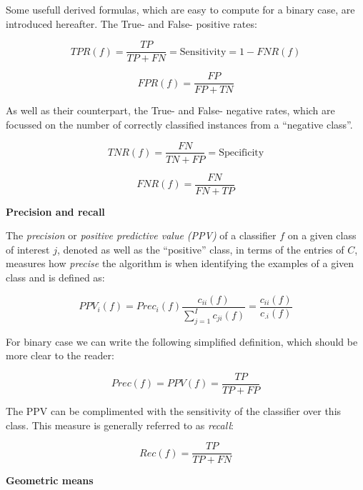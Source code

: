 \documentclass[12pt,]{article}
\begin{document}
Some usefull derived formulas, which are easy to compute for a binary
case, are introduced hereafter. The True- and False- positive rates:

\begin{equation}
TPR (f) = \frac{TP}{TP + FN} = \text{Sensitivity} = 1 - FNR (f)
\end{equation}

\begin{equation}
FPR (f) = \frac{FP}{FP + TN}
\end{equation}

As well as their counterpart, the True- and False- negative rates, which
are focussed on the number of correctly classified instances from a
``negative class''.

\begin{equation}
TNR (f) = \frac{FN}{TN + FP} = \text{Specificity}
\end{equation}

\begin{equation}
FNR (f) = \frac{FN}{FN + TP}
\end{equation}

\textbf{Precision and recall}

The \emph{precision} or \emph{positive predictive value (PPV)} of a
classifier \(f\) on a given class of interest \(j\), denoted as well as
the ``positive'' class, in terms of the entries of \(C\), measures how
\emph{precise} the algorithm is when identifying the examples of a given
class and is defined as:

\begin{equation}
PPV_i (f) = Prec_i (f) \frac{c_{ii} (f)}{\sum_{j = 1}^{I} c_{ji} (f)} = \frac{c_{ii} (f)}{c_{.i} (f)}
\end{equation}

For binary case we can write the following simplified definition, which
should be more clear to the reader:

\begin{equation}
Prec (f) = PPV (f) = \frac{TP}{TP + FP}
\end{equation}

The PPV can be complimented with the sensitivity of the classifier over
this class. This measure is generally referred to as \emph{recall}:

\begin{equation}
Rec (f) = \frac{TP}{TP + FN}
\end{equation}

\textbf{Geometric means}
\end{document}
